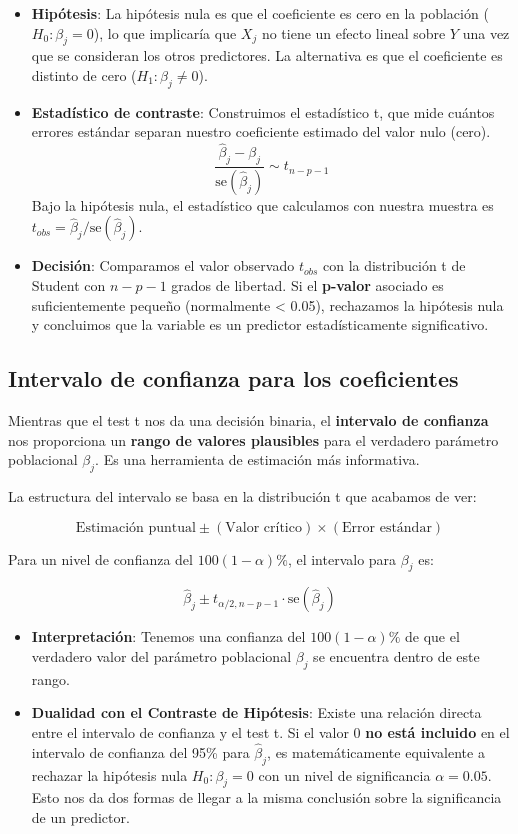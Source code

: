 \documentclass[
  letterpaper,
  DIV=11,
  numbers=noendperiod]{scrreprt}
\providecommand{\tightlist}{%
  \setlength{\itemsep}{0pt}\setlength{\parskip}{0pt}}
\begin{document}
\begin{itemize}
\tightlist
\item
  \textbf{Hipótesis}: La hipótesis nula es que el coeficiente es cero en
  la población (\(H_0: \beta_j = 0\)), lo que implicaría que \(X_j\) no
  tiene un efecto lineal sobre \(Y\) una vez que se consideran los otros
  predictores. La alternativa es que el coeficiente es distinto de cero
  (\(H_1: \beta_j \neq 0\)).
\item
  \textbf{Estadístico de contraste}: Construimos el estadístico t, que
  mide cuántos errores estándar separan nuestro coeficiente estimado del
  valor nulo (cero).
  \[\frac{\hat{\beta}_j - \beta_j}{\text{se}(\hat{\beta}_j)} \sim t_{n-p-1}\]
  Bajo la hipótesis nula, el estadístico que calculamos con nuestra
  muestra es \(t_{obs} = \hat{\beta}_j / \text{se}(\hat{\beta}_j)\).
\item
  \textbf{Decisión}: Comparamos el valor observado \(t_{obs}\) con la
  distribución t de Student con \(n-p-1\) grados de libertad. Si el
  \textbf{p-valor} asociado es suficientemente pequeño (normalmente
  \textless{} 0.05), rechazamos la hipótesis nula y concluimos que la
  variable es un predictor estadísticamente significativo.
\end{itemize}

\subsection{Intervalo de confianza para los
coeficientes}\label{intervalo-de-confianza-para-los-coeficientes}

Mientras que el test t nos da una decisión binaria, el \textbf{intervalo
de confianza} nos proporciona un \textbf{rango de valores plausibles}
para el verdadero parámetro poblacional \(\beta_j\). Es una herramienta
de estimación más informativa.

La estructura del intervalo se basa en la distribución t que acabamos de
ver:

\[\text{Estimación puntual} \pm (\text{Valor crítico}) \times (\text{Error estándar})\]

Para un nivel de confianza del \(100(1-\alpha)\%\), el intervalo para
\(\beta_j\) es:

\[\hat{\beta}_j \pm t_{\alpha/2, n-p-1} \cdot \text{se}(\hat{\beta}_j)\]

\begin{itemize}
\tightlist
\item
  \textbf{Interpretación}: Tenemos una confianza del \(100(1-\alpha)\%\)
  de que el verdadero valor del parámetro poblacional \(\beta_j\) se
  encuentra dentro de este rango.
\item
  \textbf{Dualidad con el Contraste de Hipótesis}: Existe una relación
  directa entre el intervalo de confianza y el test t. Si el valor 0
  \textbf{no está incluido} en el intervalo de confianza del 95\% para
  \(\hat{\beta}_j\), es matemáticamente equivalente a rechazar la
  hipótesis nula \(H_0: \beta_j = 0\) con un nivel de significancia
  \(\alpha=0.05\). Esto nos da dos formas de llegar a la misma
  conclusión sobre la significancia de un predictor.
\end{itemize}
\end{document}

